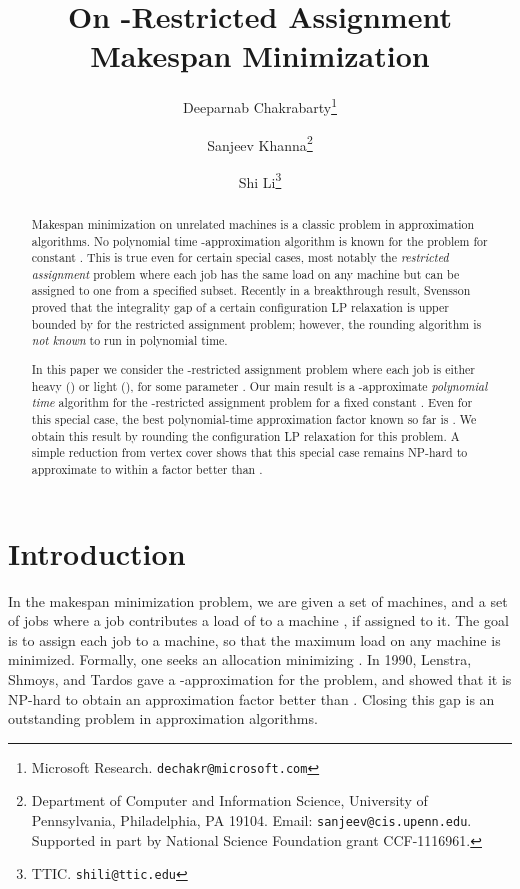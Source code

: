 \documentclass[11pt]{article}
\title{On -Restricted Assignment Makespan Minimization}
\author{Deeparnab Chakrabarty\footnote{Microsoft Research. {\tt dechakr@microsoft.com}} \and Sanjeev Khanna\thanks{Department of Computer and Information Science, University of Pennsylvania,
Philadelphia, PA 19104. Email: {\tt sanjeev@cis.upenn.edu}.  Supported in part by National Science Foundation grant CCF-1116961.}  \and Shi Li\footnote{TTIC. {\tt shili@ttic.edu}}}
\begin{document}
\date{}
\maketitle

\begin{abstract}
Makespan minimization on unrelated machines is a classic problem in approximation algorithms. No polynomial time -approximation algorithm is known for the problem for constant . This is true even for certain special cases, most notably the {\em restricted assignment} problem where each job has the same load on any machine but can be assigned to one from a specified subset. Recently in a breakthrough result, Svensson~\cite{Sve11} proved that the integrality gap of a certain configuration LP relaxation is upper bounded by  for the restricted assignment problem; however, the rounding algorithm is {\em not known} to run in polynomial time.\smallskip

In this paper we consider the -restricted assignment problem where each job is either heavy () or light (), for some parameter . 
Our main result is a -approximate \emph{polynomial time} algorithm for the -restricted assignment problem for a fixed constant . Even for this special case, the best polynomial-time approximation factor known so far is . We obtain this result by rounding the configuration LP relaxation for this problem.
A simple reduction from vertex cover shows that this special case remains NP-hard to approximate to within a factor better than .
\end{abstract}


\setcounter{page}{0}
\thispagestyle{empty}
\ifdefined\CR

\else
\newpage
\fi

\section{Introduction}

In the makespan minimization problem, we are given a set  of  machines, and a set  of  jobs where a job  contributes a load of  to a machine , if assigned to it. The goal is to assign each job to a machine, so that the maximum load on any machine is minimized. Formally, one seeks an allocation  minimizing . In 1990, Lenstra, Shmoys, and Tardos \cite{LST90} gave a -approximation for the problem, and showed that it is NP-hard to obtain an approximation factor better than . 
Closing this gap is an outstanding problem in approximation algorithms.
\end{document}
